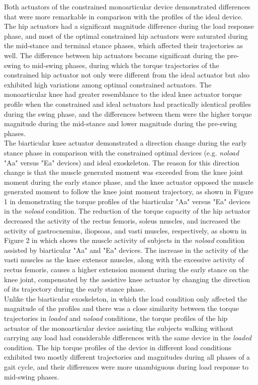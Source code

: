 \documentclass[10pt,letterpaper]{article}
\begin{document}
Both actuators of the constrained monoarticular device demonstrated differences that were more remarkable in comparison with the profiles of the ideal device. The hip actuators had a significant magnitude difference during the load response phase, and most of the optimal constrained hip actuators were saturated during the mid-stance and terminal stance phases, which affected their trajectories as well. The difference between hip actuators became significant during the pre-swing to mid-swing phases, during which the torque trajectories of the constrained hip actuator not only were different from the ideal actuator but also exhibited high variations among optimal constrained actuators. The monoarticular knee had greater resemblance to the ideal knee actuator torque profile when the constrained and ideal actuators had practically identical profiles during the swing phase, and the differences between them were the higher torque magnitude during the mid-stance and lower magnitude during the pre-swing phases.\\
The biarticular knee actuator demonstrated a direction change during the early stance phase in comparison with the constrained optimal devices (e.g. {\it noload} "Aa" versus "Ea" devices) and ideal exoskeleton. The reason for this direction change is that the muscle generated moment was exceeded from the knee joint moment during the early stance phase, and the knee actuator opposed the muscle generated moment to follow the knee joint moment trajectory, as shown in Figure 1 in \nameref{} demonstrating the torque profiles of the biarticular "Aa" versus "Ea" devices in the {\it noload} condition. The reduction of the torque capacity of the hip actuator decreased the activity of the rectus femoris, soleus muscles, and increased the activity of gastrocnemius, iliopsoas, and vasti muscles, respectively, as shown in Figure 2 in \nameref{} which shows the muscle activity of subjects in the {\it noload} condition assisted by biarticular "Aa" and "Ea" devices. The increase in the activity of the vasti muscles as the knee extensor muscles, along with the excessive activity of rectus femoris, causes a higher extension moment during the early stance on the knee joint, compensated by the assistive knee actuator by changing the direction of its trajectory during the early stance phase. \\
Unlike the biarticular exoskeleton, in which the load condition only affected the magnitude of the profiles and there was a close similarity between the torque trajectories in \textit{loaded} and \textit{noload} conditions, the torque profiles of the hip actuator of the monoarticular device assisting the subjects walking without carrying any load had considerable differences with the same device in the \textit{loaded} condition. The hip torque profiles of the device in different load conditions exhibited two mostly different trajectories and magnitudes during all phases of a gait cycle, and their differences were more unambiguous during load response to mid-swing phases.\\
\end{document}
